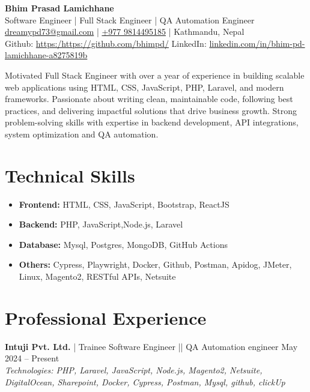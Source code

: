 \documentclass[a4paper,10pt]{article}
\begin{document}
\begin{center}
    {\LARGE \textbf{Bhim Prasad Lamichhane}} \\[0.5em]
    \small {Software Engineer} | Full Stack Engineer | QA Automation Engineer \\[0.5em]
    \href{mailto:dreamypd73@gmail.com}{dreamypd73@gmail.com} |
    \href{tel:+9779814495185}{+977 9814495185} | Kathmandu, Nepal \\[0.5em]
 
    Github: \href{https://github.com/bhimpd/}{https:/https://github.com/bhimpd/}
    LinkedIn:     \href{https://www.linkedin.com/in/bhim-pd-lamichhane-a8275819b/}{linkedin.com/in/bhim-pd-lamichhane-a8275819b}

\end{center}


\noindent Motivated Full Stack Engineer with over a year of experience in building scalable web applications using HTML, CSS, JavaScript, PHP, Laravel, and modern frameworks. Passionate about writing clean, maintainable code, following best practices, and delivering impactful solutions that drive business growth. Strong problem-solving skills with expertise in backend development, API integrations, system optimization and QA automation.



\section*{Technical Skills}
\begin{itemize}
    \item \textbf{Frontend:} HTML, CSS, JavaScript, Bootstrap, ReactJS
    \item \textbf{Backend:} PHP, JavaScript,Node.js, Laravel
    \item \textbf{Database:} Mysql, Postgres, MongoDB, GitHub Actions
    \item \textbf{Others:} Cypress, Playwright, Docker, Github, Postman, Apidog, JMeter, Linux, Magento2, RESTful APIs, Netsuite
\end{itemize}

\section*{Professional Experience}
\textbf{Intuji Pvt. Ltd.} | Trainee Software Engineer || QA Automation engineer \hfill May 2024 -- Present \\
\textit{Technologies: PHP, Laravel, JavaScript, Node.js, Magento2, Netsuite, DigitalOcean, Sharepoint, Docker, Cypress, Postman, Mysql, github, clickUp}
\end{document}

